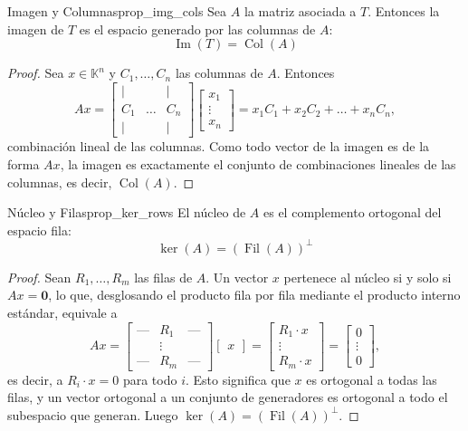 \documentclass[11pt, a4paper]{article}
\begin{document}
\begin{proposicion}{Imagen y Columnas}{prop_img_cols}
Sea $A$ la matriz asociada a $T$. Entonces la imagen de $T$ es el espacio generado por las columnas de $A$:
\[ \operatorname{Im}(T) = \operatorname{Col}(A) \]
\end{proposicion}

\begin{proof}
Sea $x \in \mathbb{K}^n$ y $C_1, \dots, C_n$ las columnas de $A$. Entonces
\[
Ax = \begin{bmatrix} | & & | \\ C_1 & \dots & C_n \\ | & & | \end{bmatrix} \begin{bmatrix} x_1 \\ \vdots \\ x_n \end{bmatrix} = x_1 C_1 + x_2 C_2 + \dots + x_n C_n,
\]
combinación lineal de las columnas. Como todo vector de la imagen es de la forma $Ax$, la imagen es exactamente el conjunto de combinaciones lineales de las columnas, es decir, $\operatorname{Col}(A)$.
\end{proof}

\begin{proposicion}{Núcleo y Filas}{prop_ker_rows}
El núcleo de $A$ es el complemento ortogonal del espacio fila:
\[ \ker(A) = (\operatorname{Fil}(A))^\perp \]
\end{proposicion}

\begin{proof}
Sean $R_1, \dots, R_m$ las filas de $A$. Un vector $x$ pertenece al núcleo si y solo si $Ax = \mathbf{0}$, lo que, desglosando el producto fila por fila mediante el producto interno estándar, equivale a
\[
Ax = \begin{bmatrix} \text{---} & R_1 & \text{---} \\ & \vdots & \\ \text{---} & R_m & \text{---} \end{bmatrix} \begin{bmatrix} x \end{bmatrix} = \begin{bmatrix} R_1 \cdot x \\ \vdots \\ R_m \cdot x \end{bmatrix} = \begin{bmatrix} 0 \\ \vdots \\ 0 \end{bmatrix},
\]
es decir, a $R_i \cdot x = 0$ para todo $i$. Esto significa que $x$ es ortogonal a todas las filas, y un vector ortogonal a un conjunto de generadores es ortogonal a todo el subespacio que generan. Luego $\ker(A) = (\operatorname{Fil}(A))^\perp$.
\end{proof}
\end{document}

